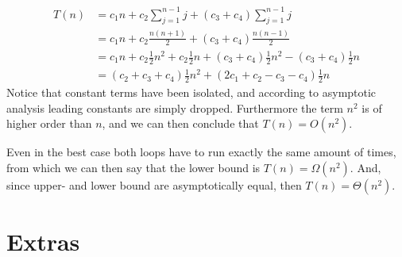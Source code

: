 \documentclass[11pt,english]{article}
\begin{document}
\begin{align}
	T(n) &= c_1 n + c_2 \sum^{n - 1}_{j = 1}{j}
	+ (c_3 + c_4)\sum^{n - 1}_{j = 1}{j}\\
	&=
	c_1 n + c_2 \frac{n(n + 1)}{2}
	+ (c_3 + c_4)\frac{n(n - 1)}{2}\\
	&=
	c_1 n + c_2 \frac{1}{2} n^2 + c_2 \frac{1}{2} n +
	(c_3 + c_4) \frac{1}{2} n^2 - (c_3 + c_4) \frac{1}{2} n \\
	&=
	(c_2 + c_3 + c_4) \frac{1}{2} n^2 +
	(2 c_1 + c_2 - c_3 - c_4) \frac{1}{2} n
\end{align}
Notice that constant terms have been isolated, and according to asymptotic
analysis leading constants are simply dropped. Furthermore the term $n^2$ is
of higher order than $n$, and we can then conclude that $T(n) = O(n^2)$.

Even in the best case both loops have to run exactly the same amount of times,
from which we can then say that the lower bound is $T(n) = \Omega(n^2)$. And,
since upper- and lower bound are asymptotically equal, then
$T(n) = \Theta(n^2)$.






\newpage
\section*{Extras}
\end{document}
